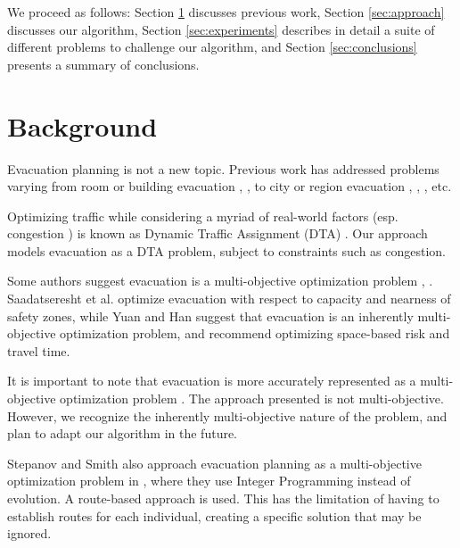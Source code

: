 \documentclass{sig-alternate-05-2015}
\begin{document}
We proceed as follows: Section \ref{sec:background} discusses previous 
work, Section \ref{sec:approach}
discusses our algorithm, Section \ref{sec:experiments} describes in 
detail a suite of different problems to challenge our algorithm, 
and Section \ref{sec:conclusions} presents a summary of conclusions.

\section{Background}\label{sec:background}
Evacuation planning is not a new topic. Previous work has
addressed problems varying from room or building evacuation
\cite{thompson1995computer}, \cite{gwynne1999review}, to city or region evacuation  
\cite{bazzan2014evolutionary}, \cite{chiu2004traffic}, \cite{lu2004capacity},
etc.

Optimizing traffic while considering a myriad of real-world factors 
(esp. congestion \cite{chiu2011dynamic}) is known 
as Dynamic Traffic Assignment (DTA) \cite{peeta2001foundations}.
Our approach models evacuation as a DTA problem, subject to constraints
such as congestion.

Some authors suggest evacuation is a multi-objective
optimization problem \cite{saadatseresht2009evacuation}, 
\cite{yuan2010multi}. 
Saadatseresht et al. optimize evacuation with respect to capacity and
nearness of safety zones, while Yuan and Han suggest that evacuation is
an inherently multi-objective optimization problem, and recommend
optimizing space-based risk and travel time.


It is important to note that evacuation is more accurately 
represented as a multi-objective optimization problem \cite{yuan2010multi}.
The approach presented is not multi-objective. However, we recognize 
the inherently multi-objective nature of the problem, and plan to adapt 
our algorithm in the future. 

Stepanov and Smith also approach evacuation planning as a
multi-objective optimization problem in
\cite{stepanov2009multi}, where they use Integer Programming
instead of evolution. A route-based approach is
used. This has the limitation of having to establish routes for each
individual, creating a specific solution that may be ignored.
\end{document}
